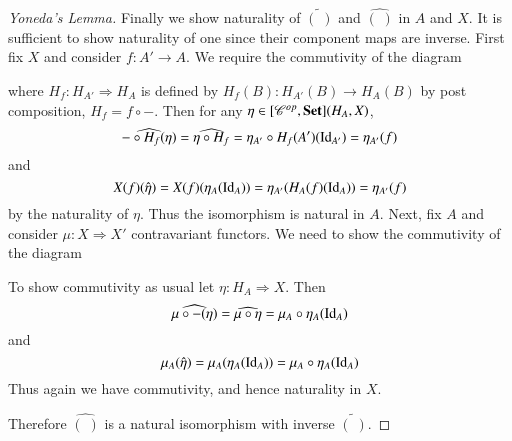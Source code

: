 \begin{proof}[Yoneda's Lemma]
    Finally we show naturality of $\tilde{(\;)}$ and $\hat{(\;)}$ in $A$ and $X$. It is sufficient to show naturality of one since their component maps are inverse. First fix $X$ and consider $f:A'\rightarrow A$. We require the commutivity of the diagram
    \begin{center}
    \end{center}
    where $H_f:H_{A'}\Rightarrow H_{A}$ is defined by $H_f(B):H_{A'}(B)\rightarrow H_{A}(B)$ by post composition, $H_f = f\circ -$. Then for any $\eta \in [\mathscr{C}^{op},\normalfont\textbf{Set}](H_A,X)$, \begin{equation*}
        \widehat{-\circ H_f(\eta)} = \widehat{\eta\circ H_f} = \eta_{A'}\circ H_f(A')(\operatorname{Id}_{A'}) = \eta_{A'}(f)
    \end{equation*}
    and \begin{equation*}
        X(f)(\hat{\eta}) = X(f)(\eta_A(\operatorname{Id}_A)) = \eta_{A'}(H_A(f)(\operatorname{Id}_A)) = \eta_{A'}(f)
    \end{equation*}
    by the naturality of $\eta$. Thus the isomorphism is natural in $A$. Next, fix $A$ and consider $\mu:X\Rightarrow X'$ contravariant functors. We need to show the commutivity of the diagram
    \begin{center}
    \end{center}
    To show commutivity as usual let $\eta:H_A\Rightarrow X$. Then \begin{equation*}
        \widehat{\mu\circ-(\eta)} = \widehat{\mu\circ \eta} = \mu_A\circ \eta_A(\operatorname{Id}_A)
    \end{equation*}
    and \begin{equation*}
        \mu_A(\hat{\eta}) = \mu_A(\eta_A(\operatorname{Id}_A)) = \mu_A\circ\eta_A(\operatorname{Id}_A)
    \end{equation*}
    Thus again we have commutivity, and hence naturality in $X$.

    Therefore $\hat{(\;)}$ is a natural isomorphism with inverse $\tilde{(\;)}$.
\end{proof}

